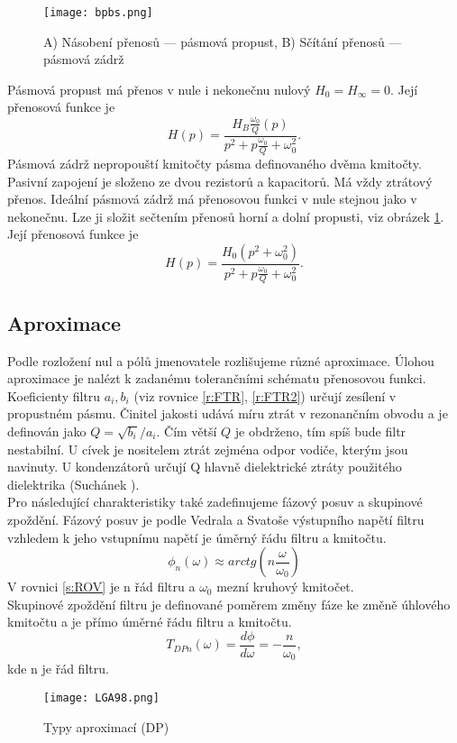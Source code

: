 \begin{figure}[h]
\centering
\texttt{[image: bpbs.png]}
\caption[A) Násobení přenosů --- pásmová propust, B) Sčítání přenosů --- pásmová zádrž]{A) Násobení přenosů --- pásmová propust, B) Sčítání přenosů --- pásmová zádrž \cite{10} \label{s:BPBS}}
\end{figure}
\noindent Pásmová propust má přenos v nule i nekonečnu nulový $H_{0} = H_{\infty} = 0$. Její přenosová funkce je~\cite{9}
\begin{equation}
H(p) = \frac{H_{B} \frac{\omega _0}{Q} (p) }{p^2 + p\frac{\omega _0}{Q} + \omega _0 ^2}.
\end{equation}
Pásmová zádrž nepropouští kmitočty pásma definovaného dvěma kmitočty. Pasivní zapojení je složeno ze dvou rezistorů a kapacitorů. Má vždy ztrátový přenos. Ideální pásmová zádrž má přenosovou funkci v nule stejnou jako v nekonečnu. Lze ji složit sečtením přenosů horní a dolní propusti, viz obrázek \ref{s:BPBS}. Její přenosová funkce je~\cite{9}
\begin{equation}
H(p) = \frac{H_{0} (p^2 + \omega_0^2)}{p^2 + p\frac{\omega _0}{Q} + \omega _0 ^2}.
\end{equation}
\subsection{Aproximace}
Podle rozložení nul a pólů jmenovatele rozlišujeme různé aproximace. Úlohou aproximace je nalézt k zadanému tolerančními schématu přenosovou funkci. Koeficienty filtru $a_i, b_i$ (viz rovnice \ref{r:FTR}, \ref{r:FTR2}) určují zesílení v propustném pásmu. Činitel jakosti udává míru ztrát v rezonančním obvodu a je definován jako $Q = \sqrt{b_i}/a_i$. Čím větší $Q$ je obdrženo, tím spíš bude filtr nestabilní. U cívek je nositelem ztrát zejména odpor vodiče, kterým jsou navinuty. U kondenzátorů určují Q hlavně dielektrické ztráty použitého dielektrika (Suchánek \cite{6}).\\
Pro následující charakteristiky také zadefinujeme fázový posuv a skupinové zpoždění. Fázový posuv je podle Vedrala a Svatoše \cite{8} výstupního napětí filtru vzhledem k jeho vstupnímu napětí je úměrný řádu filtru a kmitočtu.
\begin{equation}
\phi _n(\omega) \approx arctg(n \frac{\omega}{\omega _0}) \label{s:ROV}
\end{equation}
V rovnici \ref{s:ROV} je n řád filtru a $\omega _0$ mezní kruhový kmitočet.\\
Skupinové zpoždění filtru je definované poměrem změny fáze ke změně úhlového kmitočtu a je přímo úměrné řádu filtru a kmitočtu.\\
\begin{equation}
T _{DPn}(\omega) = \frac{d\phi}{d\omega} = - \frac{n}{\omega _0},
\end{equation}
\noindent kde n je řád filtru.\\
\begin{figure}[h]
\centering
\texttt{[image: LGA98.png]}
\caption[Typy aproximací (DP)]{Typy aproximací (DP)\cite{11}}
\end{figure}
